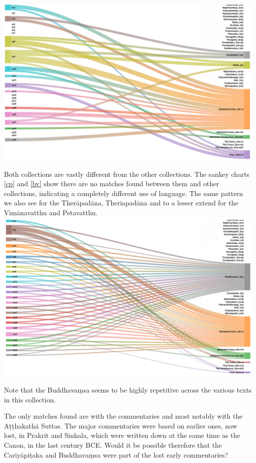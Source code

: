 \includegraphics[width=\linewidth]{cp.png}
\label{cp}

\medskip
Both collections are vastly different from the other collections. The sankey charts \ref{cp} and \ref{bv} show there are no matches found between them and other collections, indicating a completely different use of language. The same pattern we also see for the Therāpadāna, Theriapadāna and to a lesser extend for the Vimānavatthu and Petavatthu.\\

\includegraphics[width=\linewidth]{bv.png}
\label{bv}

\medskip
Note that the Buddhavaṃsa seems to be highly repetitive across the various texts in this collection.

The only matches found are with the commentaries and most notably with the Aṭṭhakathā Suttas. The major commentaries were based on earlier ones, now lost, in Prakrit and Sinhala, which were written down at the same time as the Canon, in the last century BCE. Would it be possible therefore that the Cariyāpiṭaka and Buddhavaṃsa were part of the lost early commentaries?

